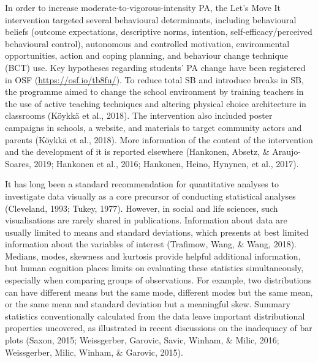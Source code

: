 \documentclass[british,man]{apa6}
\begin{document}
In order to increase moderate-to-vigorous-intensity PA, the Let's Move It intervention targeted several behavioural determinants, including behavioural beliefs (outcome expectations, descriptive norms, intention, self-efficacy/perceived behavioural control), autonomous and controlled motivation, environmental opportunities, action and coping planning, and behaviour change technique (BCT) use. Key hypotheses regarding students' PA change have been registered in OSF (\url{https://osf.io/tb8fu/}). To reduce total SB and introduce breaks in SB, the programme aimed to change the school environment by training teachers in the use of active teaching techniques and altering physical choice architecture in classrooms (Köykkä et al., 2018). The intervention also included poster campaigns in schools, a website, and materials to target community actors and parents (Köykkä et al., 2018). More information of the content of the intervention and the development of it is reported elsewhere (Hankonen, Absetz, \& Araujo-Soares, 2019; Hankonen et al., 2016; Hankonen, Heino, Hynynen, et al., 2017).

It has long been a standard recommendation for quantitative analyses to investigate data visually as a core precursor of conducting statistical analyses (Cleveland, 1993; Tukey, 1977). However, in social and life sciences, such visualisations are rarely shared in publications. Information about data are usually limited to means and standard deviations, which presents at best limited information about the variables of interest (Trafimow, Wang, \& Wang, 2018). Medians, modes, skewness and kurtosis provide helpful additional information, but human cognition places limits on evaluating these statistics simultaneously, especially when comparing groups of observations. For example, two distributions can have different means but the same mode, different modes but the same mean, or the same mean and standard deviation but a meaningful skew. Summary statistics conventionally calculated from the data leave important distributional properties uncovered, as illustrated in recent discussions on the inadequacy of bar plots (Saxon, 2015; Weissgerber, Garovic, Savic, Winham, \& Milic, 2016; Weissgerber, Milic, Winham, \& Garovic, 2015).
\end{document}
